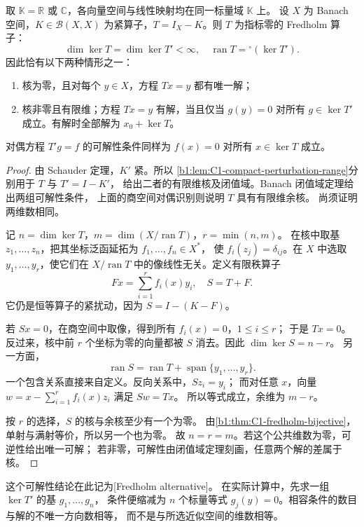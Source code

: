 \begin{theorem}\label{b1:thm:C1-fredholm-alternative}
取 \(\mathbb K=\mathbb R\) 或 \(\mathbb C\)，各向量空间与线性映射均在同一标量域 \(\mathbb K\) 上。
设 \(X\) 为 Banach 空间，\(K\in\mathcal B(X,X)\) 为紧算子，\(T=I_X-K\)。则 \(T\) 为指标零的 Fredholm 算子：
\[
 \dim\ker T=\dim\ker T'<\infty,\quad
 \operatorname{ran}T={}^{\circ}(\ker T').
\]
因此恰有以下两种情形之一：
\begin{enumerate}
\item\label{b1:item:C1-fredholm-unique}核为零，且对每个 \(y\in X\)，方程 \(Tx=y\) 都有唯一解；
\item\label{b1:item:C1-fredholm-compatible}核非零且有限维；方程 \(Tx=y\) 有解，当且仅当
\(g(y)=0\) 对所有 \(g\in\ker T'\) 成立。有解时全部解为 \(x_0+\ker T\)。
\end{enumerate}
对偶方程 \(T'g=f\) 的可解性条件同样为 \(f(x)=0\) 对所有 \(x\in\ker T\) 成立。
\end{theorem}
\begin{proof}
由 Schauder 定理，\(K'\) 紧。所以%
\cref{b1:lem:C1-compact-perturbation-range}分别用于 \(T\) 与 \(T'=I-K'\)，
给出二者的有限维核及闭值域。Banach 闭值域定理给出两组可解性条件，
上面的商空间对偶识别则说明 \(T\) 具有有限维余核。
尚须证明两维数相同。

记 \(n=\dim\ker T\)，\(m=\dim(X/\operatorname{ran}T)\)，\(r=\min(n,m)\)。
在核中取基 \(z_1,\ldots,z_n\)，把其坐标泛函延拓为 \(f_1,\ldots,f_n\in X^*\)，
使 \(f_i(z_j)=\delta_{ij}\)。在 \(X\) 中选取 \(y_1,\ldots,y_r\)，使它们在
\(X/\operatorname{ran}T\) 中的像线性无关。定义有限秩算子
\[
 Fx=\sum_{i=1}^r f_i(x)y_i,\quad S=T+F.
\]
它仍是恒等算子的紧扰动，因为 \(S=I-(K-F)\)。

若 \(Sx=0\)，在商空间中取像，得到所有 \(f_i(x)=0\)，\(1\leq i\leq r\)；
于是 \(Tx=0\)。反过来，核中前 \(r\) 个坐标为零的向量都被 \(S\) 消去。因此
\(\dim\ker S=n-r\)。
另一方面，
\[
 \operatorname{ran}S=\operatorname{ran}T+\operatorname{span}\{y_1,\ldots,y_r\}.
\]
一个包含关系直接来自定义。反向关系中，\(Sz_i=y_i\)；
而对任意 \(x\)，向量 \(w=x-\sum_{i=1}^r f_i(x)z_i\) 满足 \(Sw=Tx\)。
所以等式成立，余维为 \(m-r\)。

按 \(r\) 的选择，\(S\) 的核与余核至少有一个为零。
由\cref{b1:thm:C1-fredholm-bijective}，单射与满射等价，所以另一个也为零。
故 \(n=r=m\)。若这个公共维数为零，可逆性给出唯一可解；
若非零，可解性由闭值域定理刻画，任意两个解的差属于核。
\end{proof}

这个可解性结论在此记为[Fredholm alternative]。
在实际计算中，先求一组 \(\ker T'\) 的基 \(g_1,\ldots,g_n\)，
条件便缩减为 \(n\) 个标量等式 \(g_j(y)=0\)。相容条件的数目与解的不唯一方向数相等，
而不是与所选近似空间的维数相等。

